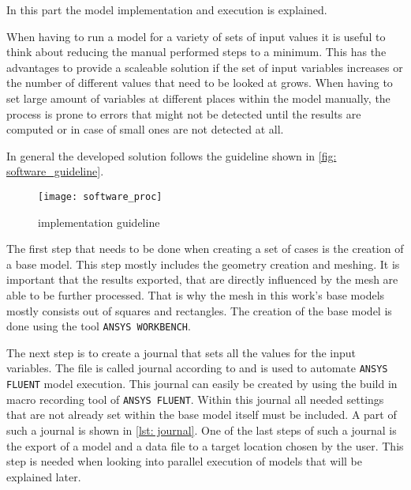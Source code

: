 \documentclass[../thesis.tex]{subfiles}
\begin{document}
In this part the model implementation and execution is explained.

When having to run a model for a variety of sets of input values it is useful to think about reducing the manual performed steps to a minimum. This has the advantages to provide a scaleable solution if the set of input variables increases or the number of different values that need to be looked at grows. When having to set large amount of variables at different places within the model manually, the process is prone to errors that might not be detected until the results are computed or in case of small ones are not detected at all.

In general the developed solution follows the guideline shown in \autoref{fig: software_guideline}.

\begin{figure}[htbp]
	\centering
	\texttt{[image: software\_proc]}
	\caption{implementation guideline}
	\label{fig: software_guideline}
\end{figure}

The first step that needs to be done when creating a set of cases is the creation of a base model. This step mostly includes the geometry creation and meshing. It is important that the results exported, that are directly influenced by the mesh are able to be further processed. That is why the mesh in this work's base models mostly consists out of squares and rectangles. The creation of the base model is done using the tool \texttt{ANSYS WORKBENCH}.

The next step is to create a journal that sets all the values for the input variables. The file is called journal according to \cite{manual2009ansys} and is used to automate \texttt{ANSYS FLUENT} model execution. This journal can easily be created by using the build in macro recording tool of \texttt{ANSYS FLUENT}. Within this journal all needed settings that are not already set within the base model itself must be included. A part of such a journal is shown in \autoref{lst: journal}. One of the last steps of such a journal is the export of a model and a data file to a target location chosen by the user. This step is needed when looking into parallel execution of models that will be explained later.

% 
%


\end{document}
